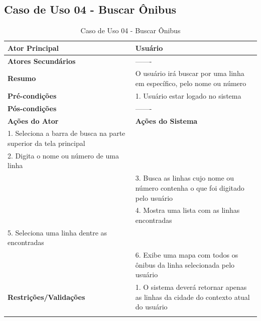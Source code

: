 \subsection{Caso de Uso 04 - Buscar \^{O}nibus}
\begin{center}
\begin{longtable}{p{8cm}|p{8cm}}
    \hline
    \textbf{Ator Principal} & Usu\'{a}rio \\
    \hline
    \textbf{Atores Secund\'{a}rios} & ------- \\
    \hline
    \textbf{Resumo} &  O usu\'{a}rio ir\'{a} buscar por uma linha em espec\'{i}fico, pelo nome ou n\'{u}mero\\
    \hline
    \textbf{Pr\'{e}-condi\c{c}\~{o}es} & 1. Usu\'{a}rio estar logado no sistema \\
    \hline
    \textbf{P\'{o}s-condi\c{c}\~{o}es} & ------- \\
    \hline
    \textbf{A\c{c}\~{o}es do Ator} & \textbf{A\c{c}\~{o}es do Sistema} \\
    \hline
    1. Seleciona a barra de busca na parte superior da tela principal & \\
    \hline
    2. Digita o nome ou n\'{u}mero de uma linha & \\
    \hline
    & 3. Busca as linhas cujo nome ou n\'{u}mero contenha o que foi digitado pelo usu\'{a}rio \\
    \hline
    & 4. Mostra uma lista com as linhas encontradas\\
    \hline
    5. Seleciona uma linha dentre as encontradas & \\
    \hline
    & 6. Exibe uma mapa com todos os \^{o}nibus da linha selecionada pelo usu\'{a}rio \\
    \hline
    \hline
    \textbf{Restri\c{c}\~{o}es/Valida\c{c}\~{o}es} & 1. O sistema dever\'{a} retornar apenas as linhas da cidade do contexto atual do usu\'{a}rio\\
\hline
\caption{Caso de Uso 04 - Buscar \^{O}nibus}
\end{longtable}
\end{center}

